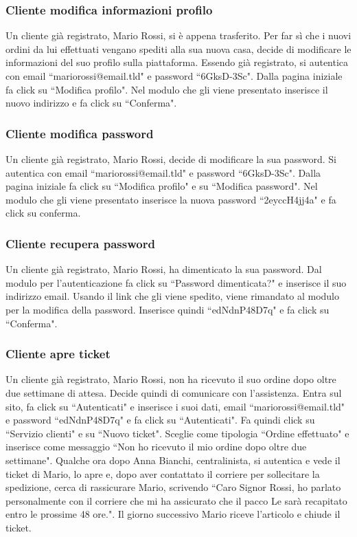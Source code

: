 \documentclass[12pt,a4paper]{article}
\begin{document}
\newpage

\subsubsection{Cliente modifica informazioni profilo}
Un cliente già registrato, Mario Rossi, si è appena trasferito. Per far sì che i nuovi ordini da lui effettuati vengano spediti alla sua nuova casa, decide di modificare le informazioni del suo profilo sulla piattaforma.
Essendo già registrato, si autentica con email ``mariorossi@email.tld" e password ``6GksD-3Sc".
Dalla pagina iniziale fa click su ``Modifica profilo".
Nel modulo che gli viene presentato inserisce il nuovo indirizzo e fa click su ``Conferma".

\subsubsection{Cliente modifica password}
Un cliente già registrato, Mario Rossi, decide di modificare la sua password. 
Si autentica con email ``mariorossi@email.tld" e password ``6GksD-3Sc".
Dalla pagina iniziale fa click su ``Modifica profilo" e su ``Modifica password".
Nel modulo che gli viene presentato inserisce la nuova password ``2eyccH4jj4a" e fa click su conferma.

\subsubsection{Cliente recupera password}
Un cliente già registrato, Mario Rossi, ha dimenticato la sua password.
Dal modulo per l'autenticazione fa click su ``Password dimenticata?" e inserisce il suo indirizzo email.
Usando il link che gli viene spedito, viene rimandato al modulo per la modifica della password. Inserisce quindi ``edNdnP48D7q" e fa click su ``Conferma".

\subsubsection{Cliente apre ticket}
Un cliente già registrato, Mario Rossi, non ha ricevuto il suo ordine dopo oltre due settimane di attesa. Decide quindi di comunicare con l'assistenza.
Entra sul sito, fa click su ``Autenticati" e inserisce i suoi dati, email ``mariorossi@email.tld" e password ``edNdnP48D7q" e fa click su ``Autenticati".
Fa quindi click su ``Servizio clienti" e su ``Nuovo ticket".
Sceglie come tipologia ``Ordine effettuato" e inserisce come messaggio ``Non ho ricevuto il mio ordine dopo oltre due settimane".
Qualche ora dopo Anna Bianchi, centralinista, si autentica e vede il ticket di Mario, lo apre e, dopo aver contattato il corriere per sollecitare la spedizione, cerca di rassicurare Mario, scrivendo ``Caro Signor Rossi, ho parlato personalmente con il corriere che mi ha assicurato che il pacco Le sarà recapitato entro le prossime 48 ore.".
Il giorno successivo Mario riceve l'articolo e chiude il ticket.
\end{document}
